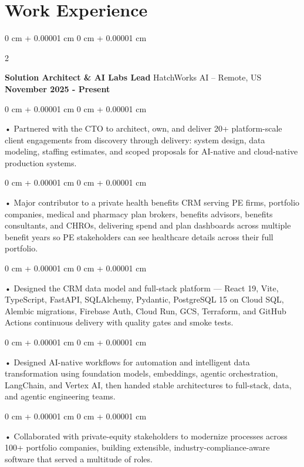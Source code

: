\documentclass[10pt, letterpaper]{article}
\newenvironment{onecolentry}{
    \begin{adjustwidth}{
        0 cm + 0.00001 cm
    }{
        0 cm + 0.00001 cm
    }
}{
    \end{adjustwidth}
} %
\newenvironment{twocolentry}[2][]{
    \onecolentry
    \def\secondColumn{#2}
    \setcolumnwidth{\fill, 4.5 cm}
    \begin{paracol}{2}
}{
    \switchcolumn \raggedleft \secondColumn
    \end{paracol}
    \endonecolentry
} %
\begin{document}
    \vspace{0.5cm}
    \section{Work Experience}
        \vspace{0.1cm}

        \begin{twocolentry}{
            \textbf{November 2025 - Present}
        }
            \textbf{Solution Architect \& AI Labs Lead} HatchWorks AI -- Remote, US\end{twocolentry}

        \begin{onecolentry}
             • Partnered with the CTO to architect, own, and deliver 20+ platform-scale client engagements from discovery through delivery: system design, data modeling, staffing estimates, and scoped proposals for AI-native and cloud-native production systems.
        \end{onecolentry}
        \begin{onecolentry}
             • Major contributor to a private health benefits CRM serving PE firms, portfolio companies, medical and pharmacy plan brokers, benefits advisors, benefits consultants, and CHROs, delivering spend and plan dashboards across multiple benefit years so PE stakeholders can see healthcare details across their full portfolio.
        \end{onecolentry}
        \begin{onecolentry}
             • Designed the CRM data model and full-stack platform --- React 19, Vite, TypeScript, FastAPI, SQLAlchemy, Pydantic, PostgreSQL 15 on Cloud SQL, Alembic migrations, Firebase Auth, Cloud Run, GCS, Terraform, and GitHub Actions continuous delivery with quality gates and smoke tests.
        \end{onecolentry}
        \begin{onecolentry}
             • Designed AI-native workflows for automation and intelligent data transformation using foundation models, embeddings, agentic orchestration, LangChain, and Vertex AI, then handed stable architectures to full-stack, data, and agentic engineering teams.
        \end{onecolentry}
        \begin{onecolentry}
             • Collaborated with private-equity stakeholders to modernize processes across 100+ portfolio companies, building extensible, industry-compliance-aware software that served a multitude of roles.
        \end{onecolentry}
\end{document}
